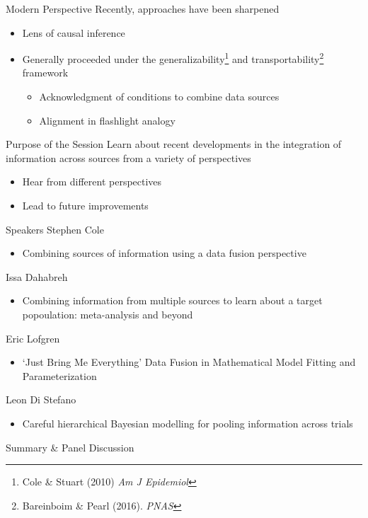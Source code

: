\documentclass{beamer}
\begin{document}
\begin{frame}{Modern Perspective}
	Recently, approaches have been sharpened
	\begin{itemize}
		\item Lens of causal inference
		\item Generally proceeded under the generalizability\footnote[frame]{Cole \& Stuart (2010) \textit{Am J Epidemiol}} and transportability\footnote[frame]{Bareinboim \& Pearl (2016). \textit{PNAS}} framework
		\begin{itemize}
			\item Acknowledgment of conditions to combine data sources
			\item Alignment in flashlight analogy
		\end{itemize}
	\end{itemize}
\end{frame}

\begin{frame}{Purpose of the Session}
	Learn about recent developments in the integration of information across sources from a variety of perspectives
	\begin{itemize}
		\item Hear from different perspectives
		\item Lead to future improvements
	\end{itemize}
\end{frame}

\begin{frame}{Speakers}
	Stephen Cole
	\begin{itemize}
		\item Combining sources of information using a data fusion perspective
	\end{itemize}
	Issa Dahabreh
	\begin{itemize}
		\item Combining information from multiple sources to learn about a target popoulation: meta-analysis and beyond
	\end{itemize}
	Eric Lofgren
	\begin{itemize}
		\item `Just Bring Me Everything' Data Fusion in Mathematical Model Fitting and Parameterization
	\end{itemize}
	Leon Di Stefano
	\begin{itemize}
		\item Careful hierarchical Bayesian modelling for pooling information across trials
	\end{itemize}
	Summary \& Panel Discussion
\end{frame}
\end{document}
